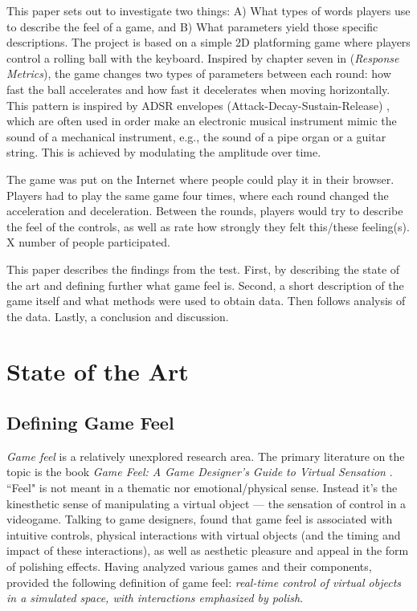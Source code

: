 This paper sets out to investigate two things: A) What types of words players use to describe the feel of a game, and B) What parameters yield those specific descriptions. The project is based on a simple 2D platforming game where players control a rolling ball with the keyboard. Inspired by chapter seven in \cite{swink} (\textit{Response Metrics}), the game changes two types of parameters between each round: how fast the ball accelerates and how fast it decelerates when moving horizontally. This pattern is inspired by ADSR envelopes (Attack-Decay-Sustain-Release) \cite{adsr}, which are often used in order make an electronic musical instrument mimic the sound of a mechanical instrument, e.g., the sound of a pipe organ or a guitar string. This is achieved by modulating the amplitude over time.

The game was put on the Internet where people could play it in their browser. Players had to play the same game four times, where each round changed the acceleration and deceleration. Between the rounds, players would try to describe the feel of the controls, as well as rate how strongly they felt this/these feeling(s). X number of people participated.

This paper describes the findings from the test. First, by describing the state of the art and defining further what game feel is. Second, a short description of the game itself and what methods were used to obtain data. Then follows analysis of the data. Lastly, a conclusion and discussion.

\section{State of the Art}
\subsection{Defining Game Feel}
\textit{Game feel} is a relatively unexplored research area. The primary literature on the topic is the book \textit{Game Feel: A Game Designer's Guide to Virtual Sensation} \cite{swink}. ``Feel" is not meant in a thematic nor emotional/physical sense. Instead it's the kinesthetic sense of manipulating a virtual object --- the sensation of control in a videogame. Talking to game designers,  found that game feel is associated with intuitive controls, physical interactions with virtual objects (and the timing and impact of these interactions), as well as aesthetic pleasure and appeal in the form of polishing effects. Having analyzed various games and their components, \cite{swink} provided the following definition of game feel: \textit{real-time control of virtual objects in a simulated space, with interactions emphasized by polish}.

